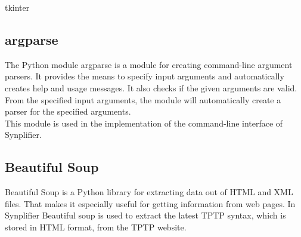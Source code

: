 tkinter

\subsection{argparse}\label{sec:BackgroundArgparse}

The Python module argparse is a module for creating command-line argument parsers.
It provides the means to specify input arguments and automatically creates help and usage messages.
It also checks if the given arguments are valid.
From the specified input arguments, the module will automatically create a parser for the specified arguments. \cite{argparse}\\
This module is used in the implementation of the command-line interface of \ac{Synplifier}.

\subsection{Beautiful Soup}\label{sec:BackgroundBeautifulSoup}

Beautiful Soup is a Python library for extracting data out of HTML and XML files.
That makes it especially useful for getting information from web pages. \cite{BeautifulSoup,BeautifulSoupDoku}
In \ac{Synplifier} Beautiful soup is used to extract the latest \ac{TPTP} syntax, which is stored in HTML format, from the \ac{TPTP} website.
